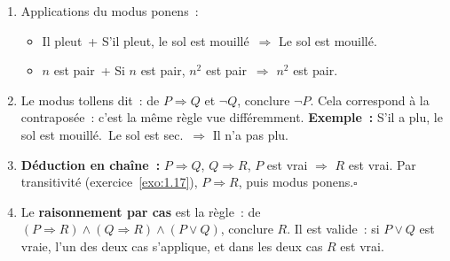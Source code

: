 \begin{enumerate}
  \item Applications du modus ponens~:
        \begin{itemize}
          \item \og Il pleut\fg\ + \og S'il pleut, le sol est mouill\'e\fg\ $\Rightarrow$
                \og Le sol est mouill\'e.\fg
          \item \og $n$ est pair\fg\ + \og Si $n$ est pair, $n^2$ est pair\fg\ $\Rightarrow$
                \og $n^2$ est pair.\fg
        \end{itemize}
  \item Le modus tollens dit~: de $P\Rightarrow Q$ et $\lnot Q$, conclure $\lnot P$.
        Cela correspond \`a la contrapos\'ee~: c'est la m\^eme r\`egle vue diff\'eremment.
        \textbf{Exemple~:} \og S'il a plu, le sol est mouill\'e.\fg\ \og Le sol est sec.\fg\
        $\Rightarrow$ \og Il n'a pas plu.\fg
  \item \textbf{D\'eduction en cha\^ine~:}
        $P\Rightarrow Q$, $Q\Rightarrow R$, $P$ est vrai $\Rightarrow$ $R$ est vrai.
        Par transitivit\'e (exercice~\ref{exo:1.17}), $P\Rightarrow R$, puis modus ponens.\hfill$\square$
  \item Le \textbf{raisonnement par cas} est la r\`egle~:
        de $(P\Rightarrow R)\land(Q\Rightarrow R)\land(P\lor Q)$, conclure $R$.
        Il est valide~: si $P\lor Q$ est vraie, l'un des deux cas s'applique,
        et dans les deux cas $R$ est vrai.
\end{enumerate}



